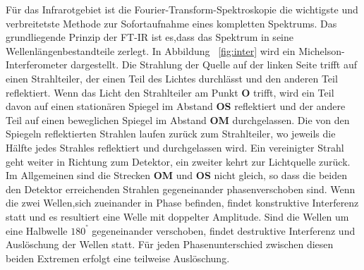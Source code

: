 \documentclass[12pt]{article}
\begin{document}
Für das Infrarotgebiet ist die Fourier-Transform-Spektroskopie die wichtigste und verbreitetste Methode zur Sofortaufnahme eines kompletten
Spektrums. Das grundliegende Prinzip der FT-IR ist es,dass das Spektrum in seine Wellenlängenbestandteile zerlegt. In Abbildung ~\ref{fig:inter} wird ein Michelson-Interferometer dargestellt.  Die Strahlung der Quelle auf der linken Seite trifft auf einen Strahlteiler, der einen Teil des Lichtes durchlässt und den anderen Teil reflektiert. Wenn das Licht den Strahlteiler am Punkt \textbf{O} trifft, wird ein Teil davon auf einen stationären Spiegel
im Abstand \textbf{OS} reflektiert und der andere Teil auf einen beweglichen Spiegel im Abstand \textbf{OM} durchgelassen. Die von den Spiegeln reflektierten Strahlen laufen zurück zum Strahlteiler, wo jeweils die Hälfte jedes Strahles reflektiert und durchgelassen wird. Ein vereinigter Strahl geht weiter in Richtung zum Detektor, ein zweiter kehrt zur Lichtquelle zurück.
Im Allgemeinen sind die Strecken \textbf{OM} und \textbf{OS} nicht gleich, so dass die beiden den
Detektor erreichenden Strahlen gegeneinander phasenverschoben sind. Wenn die zwei Wellen,sich zueinander in Phase befinden, findet konstruktive Interferenz statt und es resultiert eine Welle mit doppelter Amplitude.
Sind die Wellen um eine Halbwelle $180^°$ gegeneinander verschoben,
findet destruktive Interferenz und Auslöschung der Wellen statt. Für jeden Phasenunterschied zwischen diesen beiden Extremen erfolgt eine teilweise Auslöschung.
\end{document}
